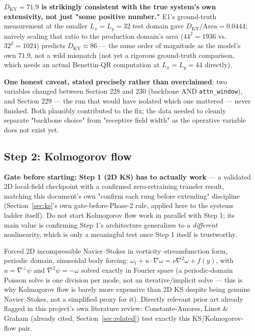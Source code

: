 \documentclass[11pt]{article}
\begin{document}
\textbf{$D_{\mathrm{KY}}=71.9$ is strikingly consistent with the true
system's own extensivity, not just "some positive number."} E1's
ground-truth measurement at the smaller $L_x{=}L_y{=}32$ test domain
gave $D_{\mathrm{KY}}/\mathrm{Area}=0.0444$; naively scaling that ratio
to the production domain's area ($44^2{=}1936$ vs.\ $32^2{=}1024$)
predicts $D_{\mathrm{KY}}\approx86$ --- the same order of magnitude as
the model's own $71.9$, not a wild mismatch (not yet a rigorous
ground-truth comparison, which needs an actual Benettin-QR computation
at $L_x{=}L_y{=}44$ directly).

\textbf{One honest caveat, stated precisely rather than overclaimed}:
two variables changed between Section 228 and 230 (backbone AND
\texttt{attn\_window}), and Section 229 --- the run that would have
isolated which one mattered --- never finished. Both plausibly
contributed to the fix; the data needed to cleanly separate "backbone
choice" from "receptive field width" as the operative variable does
not exist yet.

\subsection{Step 2: Kolmogorov flow}
\label{step:kolmogorov}

\textbf{Gate before starting: Step 1 (2D KS) has to actually work}
--- a validated 2D local-field checkpoint with a confirmed
zero-retraining transfer result, matching this document's own
"confirm each rung before extending" discipline (Section~\ref{sec:ks}'s
own gate-before-Phase-2 rule, applied here to the systems ladder
itself). Do not start Kolmogorov flow work in parallel with Step 1;
its main value is confirming Step 1's architecture generalizes to a
\emph{different} nonlinearity, which is only a meaningful test once
Step 1 itself is trustworthy.

Forced 2D incompressible Navier--Stokes in vorticity--streamfunction
form, periodic domain, sinusoidal body forcing:
$\omega_t + u\cdot\nabla\omega = \nu\nabla^2\omega + f(y)$, with $u =
\nabla^\perp\psi$ and $\nabla^2\psi=-\omega$ solved exactly in Fourier
space (a periodic-domain Poisson solve is one division per mode, not
an iterative/implicit solve --- this is why Kolmogorov flow is barely
more expensive than 2D KS despite being genuine Navier--Stokes, not a
simplified proxy for it). Directly relevant prior art already flagged
in this project's own literature review: Constante-Amores, Linot \&
Graham (already cited, Section~\ref{sec:related}) test exactly this
KS/Kolmogorov-flow pair.
\end{document}
